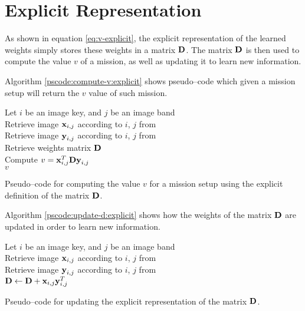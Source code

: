 \section{Explicit Representation} \label{sect:meth:explicit}

As shown in equation \ref{eq:v-explicit}, the explicit representation of the learned weights simply stores these weights in a matrix $\boldsymbol{\mathbf{D}}$. The matrix $\boldsymbol{\mathbf{D}}$ is then used to compute the value $v$ of a mission, as well as updating it to learn new information. \newline

Algorithm \ref{pscode:compute-v:explicit} shows pseudo--code which given a mission setup will return the $v$ value of such mission.

\vspace{0.4cm}
\begin{algorithm}[H]
    \SetAlgoLined
         {
            Let $i$ be an image key, and $j$ be an image band \\
            Retrieve image $\boldsymbol{\mathbf{x}}_{i,j}$ according to $i$, $j$ from \usno \\
            Retrieve image $\boldsymbol{\mathbf{y}}_{i,j}$ according to $i$, $j$ from \panstarrs \\
            Retrieve weights matrix $\boldsymbol{\mathbf{D}}$ \\
            Compute $v = \boldsymbol{\mathbf{x}}_{i,j}^T \boldsymbol{\mathbf{D}} \boldsymbol{\mathbf{y}}_{i,j}$ \\
            \Return $v$
        }
    \caption{Pseudo--code for computing the value $v$ for a mission setup using the explicit definition of the matrix $\boldsymbol{\mathbf{D}}$.}
    \label{pscode:compute-v:explicit}
\end{algorithm}
\vspace{0.4cm}

Algorithm \ref{pscode:update-d:explicit} shows how the weights of the matrix $\boldsymbol{\mathbf{D}}$ are updated in order to learn new information.

\vspace{0.4cm}
\begin{algorithm}[H]
    \SetAlgoLined
         {
            Let $i$ be an image key, and $j$ be an image band \\
            Retrieve image $\boldsymbol{\mathbf{x}}_{i,j}$ according to $i$, $j$ from \usno \\
            Retrieve image $\boldsymbol{\mathbf{y}}_{i,j}$ according to $i$, $j$ from \panstarrs \\
            $\boldsymbol{\mathbf{D}} \gets \boldsymbol{\mathbf{D}} + \boldsymbol{\mathbf{x}}_{i,j}\boldsymbol{\mathbf{y}}_{i,j}^T$ \\
        }
    \caption{Pseudo--code for updating the explicit representation of the matrix $\boldsymbol{\mathbf{D}}$.}
    \label{pscode:update-d:explicit}
\end{algorithm}
\vspace{0.4cm}

